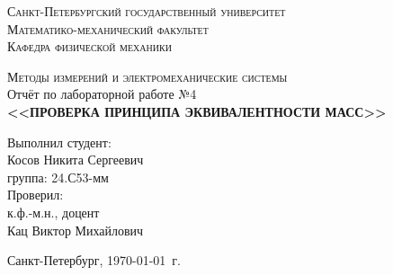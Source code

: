 \begin{titlepage}
\begin{center}
\textsc{Санкт-Петербургский государственный университет\\
Математико-механический факультет\\
Кафедра физической механики\\}

\vfill

\textsc{Методы измерений и электромеханические системы\\[3mm]}
Отчёт по лабораторной работе №4\\[6mm]


\textbf{\large<<ПРОВЕРКА ПРИНЦИПА ЭКВИВАЛЕНТНОСТИ МАСС>>}

\vfill
\end{center}

\hfill
\begin{minipage}{.5\textwidth}
Выполнил студент:\\[2mm] 
Косов Никита Сергеевич\\
группа: 24.С53-мм\\[5mm]

Проверил:\\[2mm] 
к.ф.-м.н., доцент\\
Кац Виктор Михайлович
\end{minipage}%
\vfill
\begin{center}
 Санкт-Петербург, \yeardate\today\ г.
\end{center}
\end{titlepage}